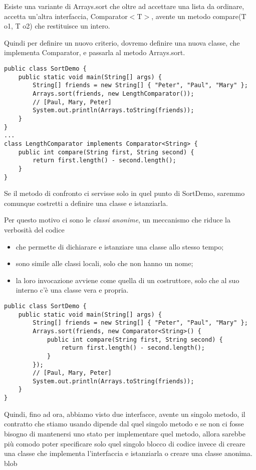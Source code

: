Esiste una variante di Arrays.sort che oltre ad accettare una lista da ordinare, accetta un'altra interfaccia, \newline Comparator$<$T$>$, avente un metodo compare(T o1, T o2) 
che restituisce un intero.

Quindi per definire un nuovo criterio, dovremo definire una nuova classe, che implementa Comparator, e passarla al metodo Arrays.sort.
\begin{lstlisting}
public class SortDemo {
    public static void main(String[] args) {
        String[] friends = new String[] { "Peter", "Paul", "Mary" };
        Arrays.sort(friends, new LengthComparator());
        // [Paul, Mary, Peter]
        System.out.println(Arrays.toString(friends));
    }
}
...
class LengthComparator implements Comparator<String> {
    public int compare(String first, String second) {
        return first.length() - second.length();
    }
}
\end{lstlisting}

Se il metodo di confronto ci servisse solo in quel punto di SortDemo, saremmo comunque costretti a definire una classe e istanziarla.

Per questo motivo ci sono le \textit{classi anonime}, un meccanismo che riduce la verbosità del codice
\begin{itemize}
    \item che permette di dichiarare e istanziare una classe allo stesso tempo;
    \item sono simile alle classi locali, solo che non hanno un nome;
    \item la loro invocazione avviene come quella di un costruttore, solo che al suo interno c'è una classe vera e propria.
\end{itemize}

\begin{lstlisting}
public class SortDemo {
    public static void main(String[] args) {
        String[] friends = new String[] { "Peter", "Paul", "Mary" };
        Arrays.sort(friends, new Comparator<String>() {
            public int compare(String first, String second) {
                return first.length() - second.length();
            }
        });
        // [Paul, Mary, Peter]
        System.out.println(Arrays.toString(friends));
    }
}
\end{lstlisting}

Quindi, fino ad ora, abbiamo visto due interfacce, avente un singolo metodo, il contratto che stiamo usando dipende dal quel singolo metodo
e se non ci fosse bisogno di mantenersi uno stato per implementare quel metodo, allora sarebbe più comodo poter specificare solo quel 
singolo blocco di codice invece di creare una classe che implementa l’interfaccia e istanziarla o creare una classe anonima.
blob